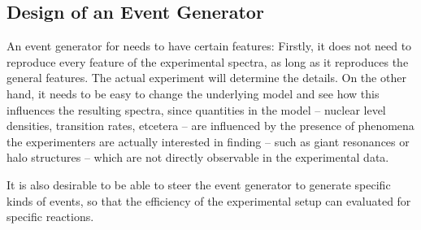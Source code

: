 
\subsection{Design of an Event Generator}
An event generator for \rtb{} needs to have certain features:
Firstly, it does not need to reproduce every feature of the experimental spectra, as long as it reproduces the general features. The actual experiment will determine the details.
On the other hand, it needs to be easy to change the underlying model and see how this influences the resulting spectra, since quantities in the model -- nuclear level densities, transition rates, etcetera -- are influenced by the presence of phenomena the experimenters are actually interested in finding -- such as giant resonances or halo structures -- which are not directly observable in the experimental data.
 
It is also desirable to be able to steer the event generator to generate specific kinds of events, so that the efficiency of the experimental setup can evaluated for specific reactions.

